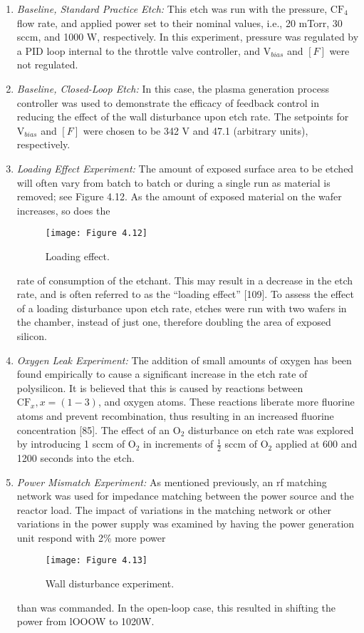 \begin{enumerate}
	\item \textit{Baseline, Standard Practice Etch:} This etch was run with the pressure, $\text{CF}_{4}$ flow rate, and applied power set to their nominal values, i.e., 20 mTorr, 30 sccm, and 1000 W, respectively. In this experiment, pressure was regulated by a PID loop internal to the throttle valve controller, and $\text{V}_{bias}$ and $[F]$ were not regulated.
	
	\item \textit{Baseline, Closed-Loop Etch:} In this case, the plasma generation process controller was used to demonstrate the efficacy of feedback control in reducing the effect of the wall disturbance upon etch rate. The setpoints for $\text{V}_{bias}$ and $[F]$ were chosen to be 342 V and 47.1 (arbitrary units), respectively.
	\item \textit{Loading Effect Experiment:} The amount of exposed surface area to be etched will often vary from batch to batch or during a single run as material is removed; see Figure 4.12. As the amount of exposed material on the wafer increases, so does the
	\begin{figure}[H]
		\centering
		\texttt{[image: Figure 4.12]}
		\bf\caption{ Loading effect.}
		\label{fig:4.12}
	\end{figure}
	rate of consumption of the etchant. This may result in a decrease in the etch rate,
	and is often referred to as the “loading effect” [109]. To assess the effect of a loading
	disturbance upon etch rate, etches were run with two wafers in the chamber, instead
	of just one, therefore doubling the area of exposed silicon.
	\item \textit{Oxygen Leak Experiment:} The addition of small amounts of oxygen has been found empirically to cause a significant increase in the etch rate of polysilicon. It is believed that this is caused by reactions between $\text{CF}_{x},x=(1-3)$, and oxygen atoms. These reactions liberate more fluorine atoms and prevent recombination, thus resulting in an increased fluorine concentration [85]. The effect of an $\text{O}_{2}$ disturbance on etch rate was explored by introducing 1 sccm of $\text{O}_{2}$ in increments of $\frac{1}{2}$ sccm of $\text{O}_{2}$ applied at 600 and 1200 seconds into the etch.
	
	\item \textit{Power Mismatch Experiment:} As mentioned previously, an rf matching network was used for impedance matching between the power source and the reactor load. The impact of variations in the matching network or other variations in the power supply
	was examined by having the power generation unit respond with 2\% more power
	\begin{figure}[H]
		\centering
		\texttt{[image: Figure 4.13]}
		\bf\caption{ Wall disturbance experiment.}
		\label{fig:4.13}
	\end{figure}
	than was commanded. In the open-loop case, this resulted in shifting the power from
	lOOOW to 1020W.
\end{enumerate}

